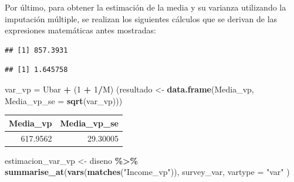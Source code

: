 \documentclass[
  12pt,
]{book}
\newenvironment{Shaded}{\begin{snugshade}}{\end{snugshade}}
\newcommand{\AttributeTok}[1]{\textcolor[rgb]{0.13,0.29,0.53}{#1}}
\newcommand{\DecValTok}[1]{\textcolor[rgb]{0.00,0.00,0.81}{#1}}
\newcommand{\FunctionTok}[1]{\textcolor[rgb]{0.13,0.29,0.53}{\textbf{#1}}}
\newcommand{\NormalTok}[1]{#1}
\newcommand{\OtherTok}[1]{\textcolor[rgb]{0.56,0.35,0.01}{#1}}
\newcommand{\SpecialCharTok}[1]{\textcolor[rgb]{0.81,0.36,0.00}{\textbf{#1}}}
\newcommand{\StringTok}[1]{\textcolor[rgb]{0.31,0.60,0.02}{#1}}
\begin{document}
Por último, para obtener la estimación de la media y su varianza utilizando la imputación múltiple, se realizan los siguientes cálculos que se derivan de las expresiones matemáticas antes mostradas:

\begin{Shaded}
\end{Shaded}

\begin{verbatim}
## [1] 857.3931
\end{verbatim}

\begin{Shaded}
\end{Shaded}

\begin{verbatim}
## [1] 1.645758
\end{verbatim}

\begin{Shaded}
\begin{Highlighting}[]
\NormalTok{var\_vp }\OtherTok{=}\NormalTok{ Ubar }\SpecialCharTok{+}\NormalTok{ (}\DecValTok{1} \SpecialCharTok{+} \DecValTok{1}\SpecialCharTok{/}\NormalTok{M) }
\NormalTok{(resultado }\OtherTok{\textless{}{-}} \FunctionTok{data.frame}\NormalTok{(Media\_vp, }
                        \AttributeTok{Media\_vp\_se =} \FunctionTok{sqrt}\NormalTok{(var\_vp)))}
\end{Highlighting}
\end{Shaded}

\begin{tabular}{r|r}
\hline
Media\_vp & Media\_vp\_se\\
\hline
617.9562 & 29.30005\\
\hline
\end{tabular}

\begin{Shaded}
\begin{Highlighting}[]
\NormalTok{estimacion\_var\_vp }\OtherTok{\textless{}{-}}\NormalTok{  diseno }\SpecialCharTok{\%\textgreater{}\%} 
  \FunctionTok{summarise\_at}\NormalTok{(}\FunctionTok{vars}\NormalTok{(}\FunctionTok{matches}\NormalTok{(}\StringTok{"Income\_vp"}\NormalTok{)), }
\NormalTok{               survey\_var,  }\AttributeTok{vartype =} \StringTok{"var"}\NormalTok{ )}
\end{Highlighting}
\end{Shaded}
\end{document}
